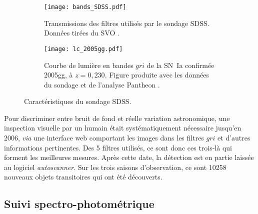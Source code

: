 \documentclass[../main/main.tex]{subfiles}
\begin{document}
\begin{figure}[ht]
    \centering
    \begin{subfigure}[]{.49\linewidth}
        \centering
        \texttt{[image: bands\_SDSS.pdf]}
        \caption{Transmissions des filtres utilisés par le sondage SDSS. Données
        tirées du SVO \citep{rodrigo2020}.}
        \label{fig:sdssbands}
    \end{subfigure}
    \begin{subfigure}[]{.49\linewidth}
        \centering
        \texttt{[image: lc\_2005gg.pdf]}
        \caption{Courbe de lumière en bandes $gri$ de la SN~Ia
            confirmée 2005gg, à $z = 0,230$. Figure produite avec les données du
        sondage et de l'analyse Pantheon \citep{scolnic2018}.}
        \label{fig:sdsslc}
    \end{subfigure}
    \caption{Caractéristiques du sondage SDSS.}
\end{figure}

% 

Pour discriminer entre bruit de fond et réelle variation astronomique, une
inspection visuelle par un humain était systématiquement nécessaire jusqu'en
2006, \textit{via} une interface web comportant les images dans les filtres
$gri$ et d'autres informations pertinentes. Des 5 filtres utilisés, ce sont donc
ces trois-là qui forment les meilleures mesures. Après cette date, la détection
est en partie laissée au logiciel \textit{autoscanner}. Sur les trois saisons
d'observation, ce sont 10258 nouveaux objets transitoires qui ont été
découverts.

\subsection{Suivi spectro-photométrique}\label{ssec:sdssspectro}
\end{document}
